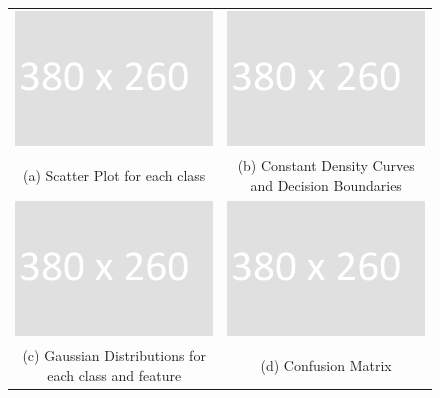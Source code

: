 \begin{figure}[h!]
	\hspace*{-2cm}\begin{tabular}{cc}
		\includegraphics[width=70mm]{dummy.png} & \includegraphics[width=70mm]{dummy.png} \\
		(a) Scatter Plot for each class & (b) Constant Density Curves and Decision Boundaries\\[4pt]
		
		\includegraphics[width=70mm]{dummy.png} &   \includegraphics[width=70mm]{dummy.png} \\
		(c) Gaussian Distributions for each class and feature & (d) Confusion Matrix \\[4pt]
		

\end{tabular}
\end{figure}
